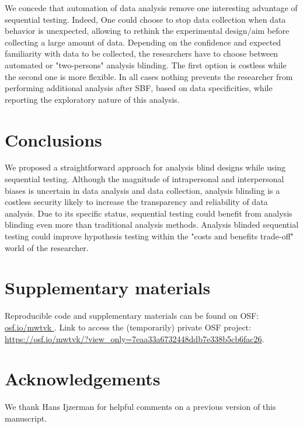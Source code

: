 \documentclass[a4paper,man,natbib,floatsintext,donotrepeattitle]{apa6}
\begin{document}
We concede that automation of data analysis remove one interesting advantage of sequential testing. Indeed, One could choose to stop data collection when data behavior is unexpected, allowing to rethink the experimental design/aim \citep{lakens_performing_2014} before collecting a large amount of data. Depending on the confidence and expected familiarity with data to be collected, the researchers have to choose between automated or "two-persons" analysis blinding. The first option is costless while the second one is more flexible. In all cases nothing prevents the researcher from performing additional analysis after SBF, based on data specificities, while reporting the exploratory nature of this analysis.

\section{Conclusions}


We proposed a straightforward approach for analysis blind designs while using sequential testing. Although the magnitude of intrapersonal and interpersonal biases is uncertain in data analysis and data collection, analysis blinding is a costless security likely to increase the transparency and reliability of data analysis. Due to its specific status, sequential testing could benefit from analysis blinding even more than traditional analysis methods. Analysis blinded sequential testing could improve hypothesis testing within the "costs and benefits trade-off" world of the researcher.

\section{Supplementary materials}\label{sec:supp}

Reproducible code and supplementary materials can be found on OSF: \url{osf.io/mwtvk
}. Link to access the (temporarily) private OSF project: \url{https://osf.io/mwtvk/?view_only=7eaa33a6732448ddb7e338b5cb6fac26}.

\section{Acknowledgements}

We thank Hans Ijzerman for helpful comments on a previous version of this manuscript.


\end{document}
